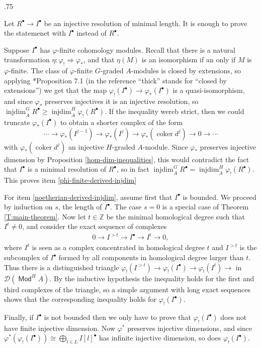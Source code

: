 \documentclass[11pt,fleqn]{article}
\makeatletter
\renewenvironment{proof}[1][\textit{Proof}]{\par
  \pushQED{\qed}%
  \normalfont \topsep.75\paraskip\relax
  \trivlist
  \item[\hskip\labelsep
        \itshape
    #1\@addpunct{.}]\ignorespaces
}{%
  \popQED\endtrivlist\@endpefalse
}
\newcommand\ZZ{\mathbb Z}
\renewcommand\to{\longrightarrow}
\renewcommand\phi{\varphi}
\newcommand\D{\mathcal D}
\DeclareMathOperator\Mod{\mathsf{Mod}}
\DeclareMathOperator\injdim{injdim}
\DeclareMathOperator\coker{coker}
\makeatother
\begin{document}
\begin{proof}
Let $R^\bullet \to I^\bullet$ be an injective resolution of minimal length.
It is enough to prove the statemenet with $I^\bullet$ instead of $R^\bullet$.

Suppose $I^\bullet$ has $\phi$-finite cohomology modules. Recall that there is 
a natural transformation $\eta: \phi_! \Rightarrow \phi_*$, and that $\eta(M)$ 
is an isomorphism if an only if $M$ is $\phi$-finite. The class of 
$\phi$-finite $G$-graded $A$-modules is closed by extensions, so applying 
\cite{Hart-RD}*{Proposition 7.1} (in the reference ``thick'' stands for 
``closed by extensions'') we get that the map $\phi_!(I^\bullet) \to 
\phi_*(I^\bullet)$ is a quasi-isomorphism, and since $\phi_*$ preserves 
injectives it is an injective resolution, so $\injdim_A^{G} R^\bullet \geq 
\injdim_A^H \phi_!(R^\bullet)$. If the inequality wereb strict, then we could 
truncate $\phi_*(I^\bullet)$ to obtain a shorter complex of the form
\[
\cdots 
  \to \phi_*(I^{j-1}) 
  \to \phi_*(I^{j}) 
  \to \phi_*(\coker d^j) 
  \to 0 
  \to \cdots
\]
with $\phi_*(\coker d^j)$ an injective $H$-graded $A$-module. Since $\phi_*$
preserves injective dimension by Proposition \ref{hom-dim-inequalities}, this
would contradict the fact that $I^\bullet$ is a minimal resolution of 
$R^\bullet$, so in fact $\injdim_A^{G} R^\bullet = \injdim_A^H 
\phi_!(R^\bullet)$. This proves item \ref{phi-finite-derived-injdim}

For item \ref{noetherian-derived-injdim}, assume first that $I^\bullet$ is 
bounded. We proceed by induction on $s$, the length of $I^\bullet$. The case 
$s = 0$ is a special case of Theorem \ref{T:main-theorem}. Now let $t \in \ZZ$ 
be the minimal homological degree such that $I^t \neq 0$, and consider the 
exact sequence of complexes
\begin{align*}
0 \to I^{> t} \to I^\bullet \to I^t \to 0,
\end{align*}
where $I^t$ is seen as a complex concentrated in homological degree $t$ and
$I^{> t}$ is the subcomplex of $I^\bullet$ formed by all components in 
homological degree larger than $t$. Thus there is a distinguished triangle
$\phi_!(I^{> t}) \to \phi_!(I^\bullet) \to \phi_!(I^t) \to$ in $\D(\Mod^H A)$.
By the inductive hypothesis the inequality holds for the first and third 
complexes of the triangle, so a simple argument with long exact sequences 
shows that the corresponding inequality holds for $\phi_!(I^\bullet)$.

Finally, if $I^\bullet$ is not bounded then we only have to prove that 
$\phi_!(I^\bullet)$ does not have finite injective dimension. Now $\phi^*$
preserves injective dimensions, and since $\phi^*(\phi_!(I^\bullet)) \cong 
\bigoplus_{l \in L} I[l]^\bullet$ has infinite injective dimension, so does
$\phi_!(I^\bullet)$.
\end{proof}
\end{document}
